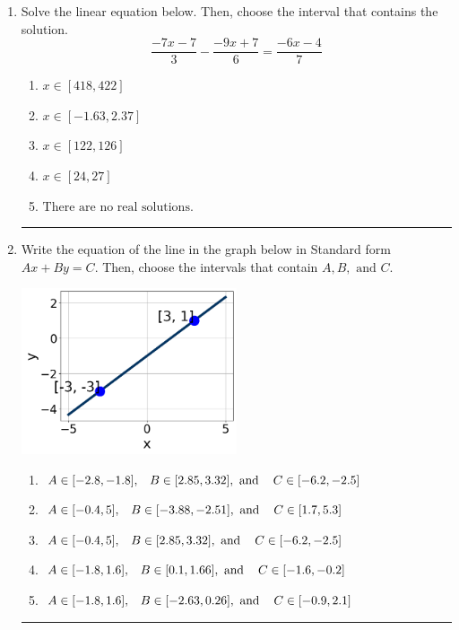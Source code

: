 \documentclass[14pt]{extbook}
\newcommand{\litem}[1]{\item#1\hspace*{-1cm}\rule{\textwidth}{0.4pt}}
\begin{document}
\begin{enumerate}
{\begin{enumerate}[label=\Alph*.]
\end{enumerate} }
\litem{
Solve the linear equation below. Then, choose the interval that contains the solution.\[ \frac{-7x -7}{3} - \frac{-9x + 7}{6} = \frac{-6x -4}{7} \]\begin{enumerate}[label=\Alph*.]
\item \( x \in [418, 422] \)
\item \( x \in [-1.63, 2.37] \)
\item \( x \in [122, 126] \)
\item \( x \in [24, 27] \)
\item \( \text{There are no real solutions.} \)

\end{enumerate} }
\litem{
Write the equation of the line in the graph below in Standard form $Ax+By=C$. Then, choose the intervals that contain $A, B, \text{ and } C$.
\begin{center}
    \includegraphics[width=0.5\textwidth]{../Figures/linearGraphToStandardCopyC.png}
\end{center}
\begin{enumerate}[label=\Alph*.]
\item \( A \in [-2.8, -1.8], \hspace{3mm} B \in [2.85, 3.32], \text{ and } \hspace{3mm} C \in [-6.2, -2.5] \)
\item \( A \in [-0.4, 5], \hspace{3mm} B \in [-3.88, -2.51], \text{ and } \hspace{3mm} C \in [1.7, 5.3] \)
\item \( A \in [-0.4, 5], \hspace{3mm} B \in [2.85, 3.32], \text{ and } \hspace{3mm} C \in [-6.2, -2.5] \)
\item \( A \in [-1.8, 1.6], \hspace{3mm} B \in [0.1, 1.66], \text{ and } \hspace{3mm} C \in [-1.6, -0.2] \)
\item \( A \in [-1.8, 1.6], \hspace{3mm} B \in [-2.63, 0.26], \text{ and } \hspace{3mm} C \in [-0.9, 2.1] \)

\end{enumerate} }
\end{enumerate}
\end{document}
